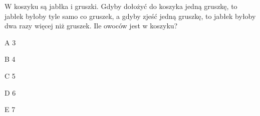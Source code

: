 \begin{tresc}
W koszyku są jabłka i gruszki. Gdyby dołożyć do koszyka jedną gruszkę, to jabłek byłoby tyle samo co gruszek, a gdyby zjeść jedną gruszkę, to jabłek byłoby dwa razy więcej niż gruszek. Ile owoców jest w koszyku?
\end{tresc}
\begin{wariant}{A} 3 \end{wariant}
\begin{wariant}{B} 4 \end{wariant}
\begin{wariant}{C} 5 \end{wariant}
\begin{wariant}{D} 6 \end{wariant}
\begin{wariant}{E} 7 \end{wariant}
